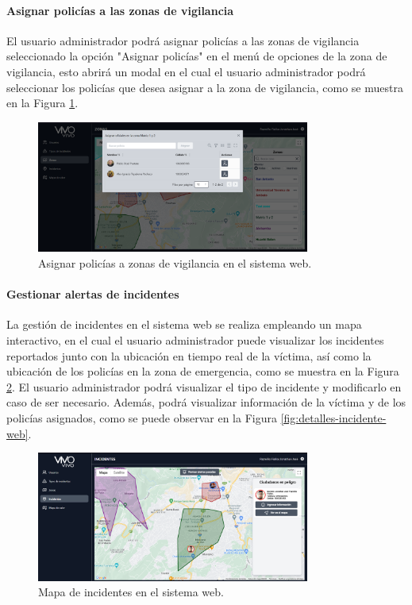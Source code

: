 \paragraph{Asignar policías a las zonas de vigilancia}
El usuario administrador podrá asignar policías a las zonas de vigilancia seleccionado la opción "Asignar policías" en el menú de opciones
de la zona de vigilancia, esto abrirá un modal en el cual el usuario administrador podrá seleccionar los policías que desea asignar a la
zona de vigilancia, como se muestra en la Figura \ref{fig:asignar-policias-zona-vigilancia-web}.

\begin{figure}[H]
    \centering
    \includegraphics[width=0.8\textwidth]{chapters/III-resultados-y-discusion/resources/images/asignar-policias-zona-vigilancia-web.png}
    \caption{Asignar policías a zonas de vigilancia en el sistema web.}
    \label{fig:asignar-policias-zona-vigilancia-web}
\end{figure}

\paragraph{Gestionar alertas de incidentes}
La gestión de incidentes en el sistema web se realiza empleando un mapa interactivo, en el cual el usuario administrador puede visualizar
los incidentes reportados junto con la ubicación en tiempo real de la víctima, así como la ubicación de los policías en la zona de emergencia,
como se muestra en la Figura \ref{fig:mapa-incidentes-web}. El usuario administrador podrá visualizar el tipo de incidente y modificarlo en
caso de ser necesario. Además, podrá visualizar información de la víctima y de los policías asignados, como se puede observar en la Figura
\ref{fig:detalles-incidente-web}.

\begin{figure}[H]
    \centering
    \includegraphics[width=0.8\textwidth]{chapters/III-resultados-y-discusion/resources/images/mapa-incidentes-web.png}
    \caption{Mapa de incidentes en el sistema web.}
    \label{fig:mapa-incidentes-web}
\end{figure}

